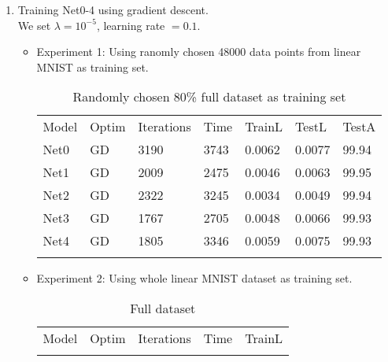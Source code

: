 \begin{enumerate}
	\item Training Net0-4 using gradient descent.\\
	We set $\lambda = 10^{-5}$, learning rate $= 0.1$.
	\begin{itemize}
		\item Experiment 1: Using ranomly chosen 48000 data points from linear MNIST as training set.\\
		\begin{table}[H]
			\centering
			\caption{Randomly chosen 80\% full dataset as training set}
			\label{tab:1}      
			\begin{tabular}{lllllll}
				\hline\noalign{\smallskip}
				Model &  Optim & Iterations & Time  & TrainL  & TestL & TestA \\
				\noalign{\smallskip}\hline\noalign{\smallskip}
				
				Net0 & GD & 3190 & 3743 & 0.0062 & 0.0077 & 99.94   \\
				
				Net1 & GD & 2009 & 2475 & 0.0046 & 0.0063 & 99.95 \\
				
				Net2 & GD & 2322 & 3245 & 0.0034 & 0.0049 & 99.94 \\
				
				Net3 & GD & 1767 & 2705 & 0.0048 & 0.0066 & 99.93 \\
				
				Net4 & GD & 1805 & 3346 &0.0059 & 0.0075 & 99.93 \\
				
				\noalign{\smallskip}\hline
				
			\end{tabular}
		\end{table}
		

	
	
	
		\item Experiment 2: Using whole linear MNIST dataset as training set.
		\begin{table}[H]
			\centering
			\caption{Full dataset}
			\label{tab:2}      
			\begin{tabular}{lllll}
				\hline\noalign{\smallskip}
				Model &  Optim & Iterations & Time  & TrainL \\
				\noalign{\smallskip}\hline\noalign{\smallskip}
				

\end{tabular}
\end{table}
\end{itemize}
\end{enumerate}
